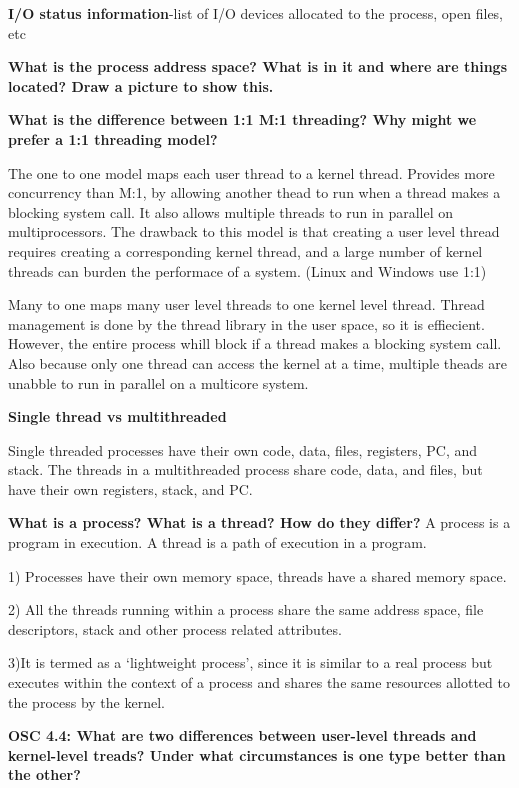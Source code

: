 \documentclass[8pt,landscape]{article}
\begin{document}
\begin{multicols}{3}
\begin{tiny}
\textbf{I/O status information}-list of I/O devices allocated to the process, open files, etc

\textbf{What is the process address space? What is in it and where are things located?
Draw a picture to show this.} 

\textbf{What is the difference between 1:1 M:1 threading? Why might we prefer a 1:1 threading 
model?}

The one to one model maps each user thread to a kernel thread. Provides more concurrency than M:1,
by allowing another thead to run when a thread makes a blocking system call. It also allows 
multiple threads to run in parallel on multiprocessors. The drawback to this model is that creating
a user level thread requires creating a corresponding kernel thread, and a large number of kernel 
threads can burden the performace of a system. (Linux and Windows use 1:1)

Many to one maps many user level threads to one kernel level thread. Thread management is done by
the thread library in the user space, so it is effiecient. However, the entire process whill block
if a thread makes a blocking system call. Also because only one thread can access the kernel at a
time, multiple theads are unabble to run in parallel on a multicore system.

\textbf{Single thread vs multithreaded}

Single threaded processes have their own code, data, files, registers, PC, and stack.
The threads in a multithreaded process share code, data, and files, but have their own registers,
stack, and PC.

\textbf{What is a process? What is a thread? How do they differ?} 
A process is a program in execution. A thread is a path of execution in a program.

1) Processes have their own memory space, threads have a shared memory space. 

2) All the threads running within a process share the same address space, file descriptors, stack 
and other process related attributes. 

3)It is termed as a ‘lightweight process’, since it is similar to a real process but executes 
within the context of a process and shares the same resources allotted to the process by the 
kernel.

\textbf{OSC 4.4: What are two differences between user-level threads and kernel-level treads? Under what circumstances is one type better than the other?}


\end{tiny}
\end{multicols}
\end{document}
